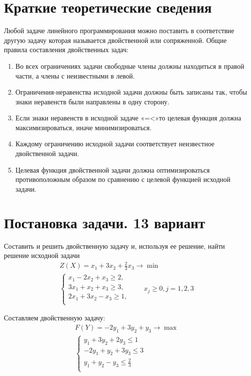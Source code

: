 \documentclass[a4paper, 12pt]{article}
\begin{document}
\section{Краткие теоретические сведения}
Любой задаче линейного программирования можно поставить в соответствие другую задачу которая называется двойственной или сопряженной. Общие правила составления двойственных задач: 
\begin{enumerate}
  \item Во всех ограничениях задачи свободные члены должны находиться в правой части, а члены с неизвестными в левой. 
  \item Ограничения-неравенства исходной задачи должны быть записаны так, чтобы знаки неравенств были направлены в одну сторону. 
  \item Если знаки неравенств в исходной задаче «=<»то целевая функция должна максимизироваться, иначе минимизироваться.
  \item Каждому ограничению исходной задачи соответствует неизвестное двойственной задачи. 
  \item Целевая функция двойственной задачи должна оптимизироваться противоположным образом по сравнению с целевой функцией исходной задачи. 
\end{enumerate}
\section{Постановка задачи. 13 вариант}
Составить и решить двойственную задачу и, используя ее решение, найти решение исходной задачи
\begin{align*}
  Z(X)=x_1+3x_2+\frac{2}{3}x_3 \rightarrow \min\\
  \begin{cases}
    x_1-2x_2+x_3 \geq 2,\\
    3x_1+x_2+x_3 \geq 3,\\
    2x_1+3x_2-x_3\geq 1,\\
  \end{cases}
  \qquad x_j \geq 0, j=1,2,3
\end{align*}

Составляем двойственную задачу:
\begin{align*}
  F(Y)=-2y_1+3y_2+y_3 \rightarrow \max\\
  \begin{cases}
    y_1+3y_2+2y_3 \leq 1\\
    -2y_1+y_2+3y_3 \leq 3\\
    y_1+y_2-y_3 \leq \frac{2}{3}\\
  \end{cases}
\end{align*}
\end{document}
